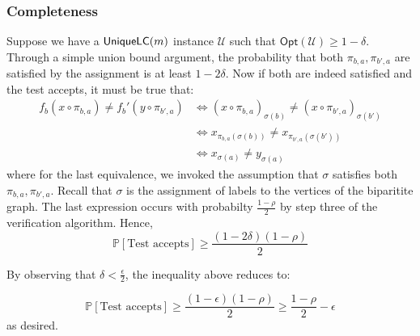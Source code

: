 \subsubsection{Completeness}
%
Suppose we have a $\mathsf{UniqueLC}(m)$ instance $\mathcal{U}$ such that $\mathsf{Opt}(\mathcal{U}) \geq 1 - \delta$. Through a simple union bound argument, the probability that both $\pi_{b,a},\pi_{b',a}$ are satisfied by the assignment is at least $1- 2\delta$. Now if both are indeed satisfied and the test accepts, it must be true that:
%
\begin{align*}
    f_b(x \circ \pi_{b,a}) \neq f_b'(y \circ \pi_{b',a}) & \iff
    (x \circ \pi_{b,a})_{\sigma(b)} \neq (x \circ \pi_{b',a})_{\sigma(b')} \\
    & \iff x_ {\pi_{b,a}(\sigma(b))} \neq x_ {\pi_{b',a}(\sigma(b'))} \\
    & \iff x_{\sigma(a)} \neq y_{\sigma(a)}
\end{align*}
where for the last equivalence, we invoked the assumption that $\sigma$ satisfies both $\pi_{b,a},\pi_{b',a}$. Recall that $\sigma$ is the assignment of labels to the vertices of the biparitite graph. The last expression occurs with probabilty $\frac{1 - \rho}{2}$ by step three of the verification algorithm. Hence,
\[ \mathbb{P}[\text{Test accepts}] \geq \frac{(1-2\delta)(1 - \rho)}{2}\]

By observing that $\delta < \frac{\epsilon}{2}$, the inequality above reduces to:

\begin{equation}
  \mathbb{P}[\text{Test accepts}] \geq \frac{(1-\epsilon)(1 - \rho)}{2} \geq \frac{1 - \rho}{2} - \epsilon
\end{equation}
as desired.

